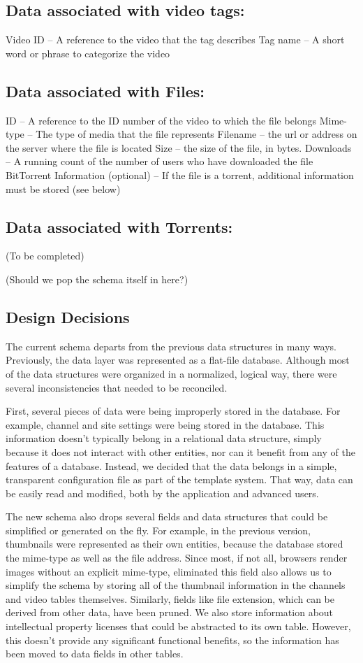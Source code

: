 \documentclass[a4paper,12pt]{report}
\begin{document}
\subsection{Data associated with video tags:}
	Video ID – A reference to the video that the tag describes
	Tag name – A short word or phrase to categorize the video

\subsection{Data associated with Files:}
ID – A reference to the ID number of the video to which the file belongs
Mime-type – The type of media that the file represents
Filename – the url or address on the server where the file is located
Size – the size of the file, in bytes.
Downloads – A running count of the number of users who have downloaded the file
BitTorrent Information (optional) – If the file is a torrent, additional information must be stored (see below)

\subsection{Data associated with Torrents:}
(To be completed)

(Should we pop the schema itself in here?)

\subsection{Design Decisions}
The current schema departs from the previous data structures in many ways. Previously, the data layer was represented as a flat-file database. 
Although most of the data structures were organized in a normalized, logical way, there were several inconsistencies that needed to be reconciled.

First, several pieces of data were being improperly stored in the database. For example, channel and site settings were being stored in the database. This information doesn't typically belong in a relational data structure, simply because it does not interact with other entities, nor can it benefit from any of the features of a database. 
Instead, we decided that the data belongs in a simple, transparent configuration file as part of the template system. 
That way, data can be easily read and modified, both by the application and advanced users. 

The new schema also drops several fields and data structures that could be simplified or generated on the fly. 
For example, in the previous version, thumbnails were represented as their own entities, because the database stored the mime-type as well as the file address. 
Since most, if not all, browsers render images without an explicit mime-type, eliminated this field also allows us to simplify the schema by storing all of the thumbnail information in the channels and video tables themselves. Similarly, fields like file extension, which can be derived from other data, have been pruned. 
We also store information about intellectual property licenses that could be abstracted to its own table. 
However, this doesn't provide any significant functional benefits, so the information has been moved to data fields in other tables.
\end{document}
